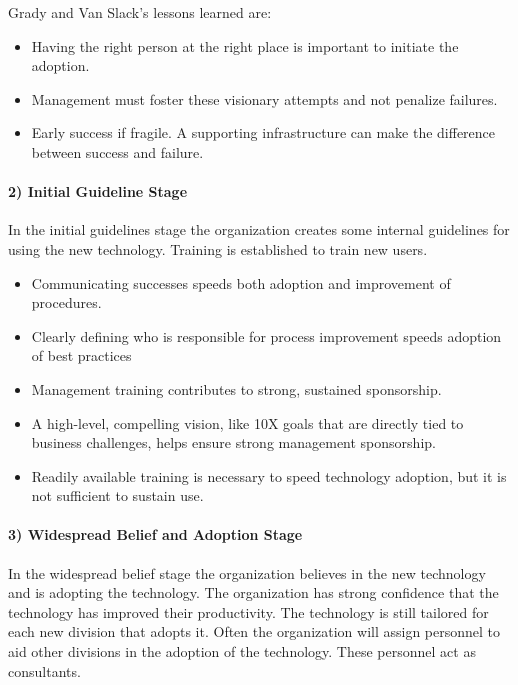 Grady and Van Slack's lessons
learned are:
\begin{itemize}
\item{Having the right person at the right place is important to initiate
the adoption.}
\item{Management must foster these visionary attempts and not penalize
failures.} 
\item{Early success if fragile.  A supporting infrastructure can make the
difference between success and failure.}
\end{itemize}

\paragraph{2) Initial Guideline Stage}
In the initial guidelines stage the organization creates some internal
guidelines for using the new technology.  Training is established to train
new users.  
\begin{itemize}
\item{Communicating successes speeds both adoption and improvement of
procedures.}
\item{Clearly defining who is responsible for process improvement speeds
adoption of best practices}
\item{Management training contributes to strong, sustained sponsorship.}
\item{A high-level, compelling vision, like 10X goals that are directly
tied to business challenges, helps ensure strong management sponsorship.}
\item{Readily available training is necessary to speed technology adoption,
but it is not sufficient to sustain use.}
\end{itemize}

\paragraph{3) Widespread Belief and Adoption Stage}
In the widespread belief stage the organization believes in the new
technology and is adopting the technology.  The organization has strong
confidence that the technology has improved their productivity.  The
technology is still tailored for each new division that adopts it.  Often
the organization will assign personnel to aid other divisions in the
adoption of the technology.  These personnel act as consultants.  

